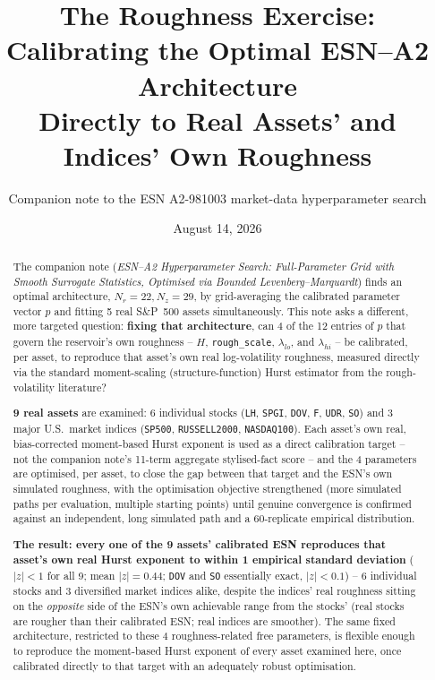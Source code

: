 \documentclass[11pt]{article}
\title{The Roughness Exercise: Calibrating the Optimal ESN--A2 Architecture\\
Directly to Real Assets' and Indices' Own Roughness}
\author{Companion note to the ESN A2-981003 market-data hyperparameter search}
\date{August 14, 2026}
\begin{document}
\maketitle

\begin{abstract}
The companion note (\emph{ESN--A2 Hyperparameter Search: Full-Parameter Grid with
Smooth Surrogate Statistics, Optimised via Bounded Levenberg--Marquardt}) finds an
optimal architecture, $N_r=22,N_z=29$, by grid-averaging the calibrated parameter
vector $p$ and fitting 5 real S\&P~500 assets simultaneously. This note asks a
different, more targeted question: \textbf{fixing that architecture}, can 4 of the
12 entries of $p$ that govern the reservoir's own roughness -- $H$,
\texttt{rough\_scale}, $\lambda_{lo}$, and $\lambda_{hi}$ -- be calibrated, per
asset, to reproduce that asset's own real log-volatility roughness, measured
directly via the standard moment-scaling (structure-function) Hurst estimator from
the rough-volatility literature?

\textbf{9 real assets} are examined: 6 individual stocks (\texttt{LH}, \texttt{SPGI},
\texttt{DOV}, \texttt{F}, \texttt{UDR}, \texttt{SO}) and 3 major U.S.\ market
indices (\texttt{SP500}, \texttt{RUSSELL2000}, \texttt{NASDAQ100}). Each asset's
own real, bias-corrected moment-based Hurst exponent is used as a direct
calibration target -- not the companion note's 11-term aggregate stylised-fact
score -- and the 4 parameters are optimised, per asset, to close the gap between
that target and the ESN's own simulated roughness, with the optimisation objective
strengthened (more simulated paths per evaluation, multiple starting points) until
genuine convergence is confirmed against an independent, long simulated path and a
60-replicate empirical distribution.

\textbf{The result: every one of the 9 assets' calibrated ESN reproduces that
asset's own real Hurst exponent to within 1 empirical standard deviation}
($|z|<1$ for all 9; mean $|z|=0.44$; \texttt{DOV} and \texttt{SO} essentially
exact, $|z|<0.1$) -- 6 individual stocks and 3 diversified market indices alike,
despite the indices' real roughness sitting on the \emph{opposite} side of the
ESN's own achievable range from the stocks' (real stocks are rougher than their
calibrated ESN; real indices are smoother). The same fixed architecture, restricted
to these 4 roughness-related free parameters, is flexible enough to reproduce the
moment-based Hurst exponent of every asset examined here, once calibrated directly
to that target with an adequately robust optimisation.
\end{abstract}
\end{document}
